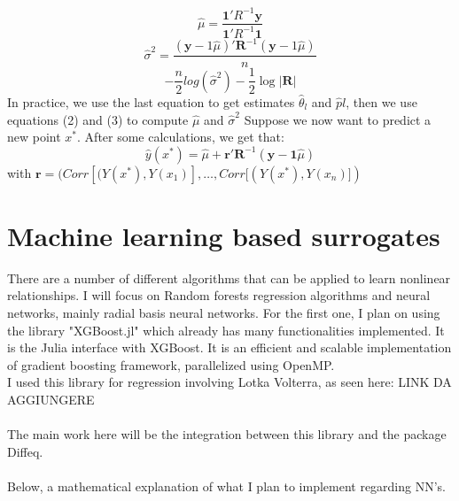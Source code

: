 \documentclass[11pt,a4paper,oneside,titlepage,openright]{book}
\begin{document}
\begin{equation}
\hat \mu = \frac{\mathbf{1}' R^{-1}\mathbf{y}}{\mathbf{1}' R^{-1}\mathbf{1}} 
\end{equation} 
\begin{equation}
\hat \sigma^2 = \frac{(\mathbf{y}-1\hat \mu)'\mathbf{R}^{-1}(\mathbf{y}-1\hat \mu)}{n} 
\end{equation} 
\begin{equation}
-\frac{n}{2}log(\hat \sigma^2) -\frac{1}{2}\log{\vert \mathbf{R} \vert}
\end{equation}
In practice, we use the last equation to get estimates  $\hat \theta_l$ and $\hat pl$, then we use equations (2) and (3) to compute $\hat \mu$ and $\hat \sigma^2$
Suppose we now want to predict a new point $x^*$. After some calculations, we get that: 
\begin{equation}
\hat y(x^*) = \hat \mu + \mathbf{r}' \mathbf{R}^{-1}(\mathbf{y} - \mathbf{1}\hat \mu)
\end{equation}
with $\mathbf{r} = (Corr[(Y(x^*),Y(x_1)], \ldots,Corr[(Y(x^*),Y(x_n)])$



\section*{Machine learning based surrogates}
There are a number of different algorithms that can be applied to learn nonlinear relationships. I will focus on Random forests regression algorithms and neural networks, mainly radial basis neural networks. 
For the first one, I plan on using the library "XGBoost.jl" which already has many functionalities implemented. It is the Julia interface with  XGBoost.  It is an efficient and scalable implementation of gradient boosting framework, parallelized using OpenMP. \\I used this library for regression involving Lotka Volterra, as seen here: LINK DA AGGIUNGERE\\\\
The main work here will be the integration between this library and the package Diffeq.\\\\
Below, a mathematical explanation of what I plan to implement regarding NN's.
\end{document}

